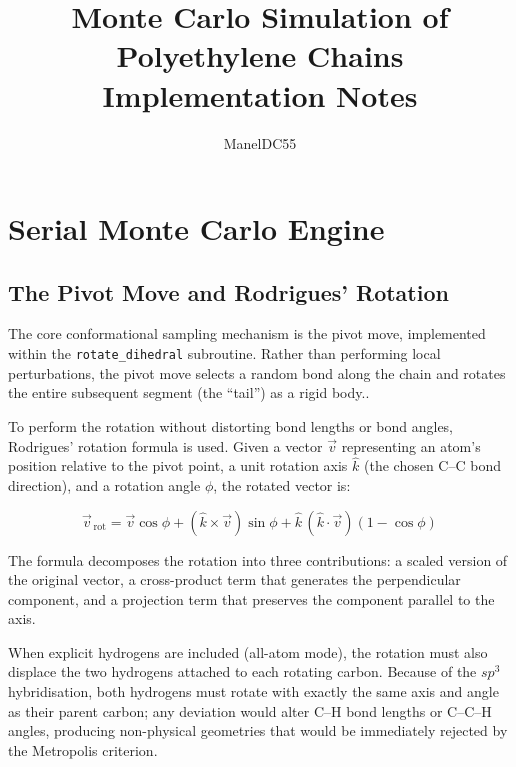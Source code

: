 \documentclass[11pt, a4paper]{article}
\begin{document}
\title{\textbf{Monte Carlo Simulation of Polyethylene Chains}\\
       \large Implementation Notes}
\author{ManelDC55}
\date{}
\maketitle
\tableofcontents
\newpage

\section{Serial Monte Carlo Engine}
\label{sec:serial}

\subsection{The Pivot Move and Rodrigues' Rotation}

The core conformational sampling mechanism is the pivot move, implemented
within the \texttt{rotate\_dihedral} subroutine. Rather than performing local
perturbations, the pivot move selects a random bond along the chain and rotates
the entire subsequent segment (the ``tail'') as a rigid body..

To perform the rotation without distorting bond lengths or bond angles,
Rodrigues' rotation formula is used. Given a vector $\vec{v}$ representing
an atom's position relative to the pivot point, a unit rotation axis $\hat{k}$
(the chosen C--C bond direction), and a rotation angle $\phi$, the rotated vector
is:

\begin{equation}
  \vec{v}_{\,\text{rot}} = \vec{v}\cos\phi
    + (\hat{k} \times \vec{v})\sin\phi
    + \hat{k}\,(\hat{k} \cdot \vec{v})(1 - \cos\phi)
  \label{eq:rodrigues}
\end{equation}

The formula decomposes the rotation into three contributions: a scaled version
of the original vector, a cross-product term that generates the perpendicular
component, and a projection term that preserves the component parallel to the
axis.

When explicit hydrogens are included (all-atom mode), the rotation must also
displace the two hydrogens attached to each rotating carbon. Because of the
$sp^3$ hybridisation, both hydrogens must rotate with exactly the same
axis and angle as their parent carbon; any deviation would alter C--H bond
lengths or C--C--H angles, producing non-physical geometries that would be
immediately rejected by the Metropolis criterion.
\end{document}
